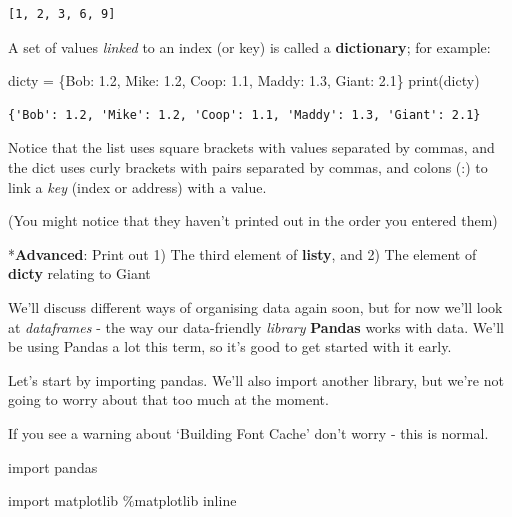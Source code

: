 \documentclass[
  letterpaper,
  DIV=11,
  numbers=noendperiod]{scrreprt}
\newenvironment{Shaded}{\begin{snugshade}}{\end{snugshade}}
\newcommand{\BuiltInTok}[1]{\textcolor[rgb]{0.00,0.23,0.31}{#1}}
\newcommand{\FloatTok}[1]{\textcolor[rgb]{0.68,0.00,0.00}{#1}}
\newcommand{\ImportTok}[1]{\textcolor[rgb]{0.00,0.46,0.62}{#1}}
\newcommand{\NormalTok}[1]{\textcolor[rgb]{0.00,0.23,0.31}{#1}}
\newcommand{\OperatorTok}[1]{\textcolor[rgb]{0.37,0.37,0.37}{#1}}
\newcommand{\StringTok}[1]{\textcolor[rgb]{0.13,0.47,0.30}{#1}}
\begin{document}
\begin{verbatim}
[1, 2, 3, 6, 9]
\end{verbatim}

A set of values \emph{linked} to an index (or key) is called a
\textbf{dictionary}; for example:

\begin{Shaded}
\begin{Highlighting}[]
\NormalTok{dicty }\OperatorTok{=}\NormalTok{ \{}\StringTok{\textquotesingle{}Bob\textquotesingle{}}\NormalTok{: }\FloatTok{1.2}\NormalTok{, }\StringTok{\textquotesingle{}Mike\textquotesingle{}}\NormalTok{: }\FloatTok{1.2}\NormalTok{, }\StringTok{\textquotesingle{}Coop\textquotesingle{}}\NormalTok{: }\FloatTok{1.1}\NormalTok{, }\StringTok{\textquotesingle{}Maddy\textquotesingle{}}\NormalTok{: }\FloatTok{1.3}\NormalTok{, }\StringTok{\textquotesingle{}Giant\textquotesingle{}}\NormalTok{: }\FloatTok{2.1}\NormalTok{\}}
\BuiltInTok{print}\NormalTok{(dicty)}
\end{Highlighting}
\end{Shaded}

\begin{verbatim}
{'Bob': 1.2, 'Mike': 1.2, 'Coop': 1.1, 'Maddy': 1.3, 'Giant': 2.1}
\end{verbatim}

Notice that the list uses square brackets with values separated by
commas, and the dict uses curly brackets with pairs separated by commas,
and colons (:) to link a \emph{key} (index or address) with a value.

(You might notice that they haven't printed out in the order you entered
them)

*\textbf{Advanced}: Print out 1) The third element of \textbf{listy},
and 2) The element of \textbf{dicty} relating to Giant

We'll discuss different ways of organising data again soon, but for now
we'll look at \emph{dataframes} - the way our data-friendly
\emph{library} \textbf{Pandas} works with data. We'll be using Pandas a
lot this term, so it's good to get started with it early.

Let's start by importing pandas. We'll also import another library, but
we're not going to worry about that too much at the moment.

If you see a warning about `Building Font Cache' don't worry - this is
normal.

\begin{Shaded}
\begin{Highlighting}[]
\ImportTok{import}\NormalTok{ pandas}

\ImportTok{import}\NormalTok{ matplotlib}
\OperatorTok{\%}\NormalTok{matplotlib inline}
\end{Highlighting}
\end{Shaded}
\end{document}
